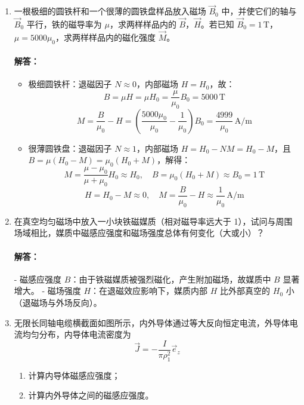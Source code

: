 \begin{enumerate}
    \item 一根极细的圆铁杆和一个很薄的圆铁盘样品放入磁场 $\vec{B}_0$ 中，并使它们的轴与 $\vec{B}_0$ 平行，铁的磁导率为 $\mu$，求两样样品内的 $\vec{B}$，$\vec{H}$。若已知 $\vec{B}_0=1\,\text{T}$，$\mu=5000\mu_0$，求两样样品内的磁化强度 $\vec{M}$。

    \paragraph{解答：}
    \begin{itemize}
        \item 极细圆铁杆：退磁因子 $N\approx0$，内部磁场 $H=H_0$，故：
        \[
        B = \mu H = \mu H_0 = \frac{\mu}{\mu_0}B_0 = 5000\,\text{T}
        \]
        \[
        M = \frac{B}{\mu_0} - H = \left(\frac{5000\mu_0}{\mu_0} - \frac{1}{\mu_0}\right)B_0 = \frac{4999}{\mu_0}\,\text{A/m}
        \]

        \item 很薄圆铁盘：退磁因子 $N\approx1$，内部磁场 $H=H_0 - N M = H_0 - M$，且 $B=\mu(H_0 - M)=\mu_0(H_0 + M)$，解得：
        \[
        M = \frac{\mu-\mu_0}{\mu+\mu_0}H_0 \approx H_0, \quad B=\mu_0(H_0+M) \approx B_0=1\,\text{T}
        \]
        \[
        H = H_0 - M \approx 0, \quad M = \frac{B}{\mu_0} - H \approx \frac{1}{\mu_0}\,\text{A/m}
        \]
    \end{itemize}

    \item 在真空均匀磁场中放入一小块铁磁媒质（相对磁导率远大于 1），试问与周围场域相比，媒质中磁感应强度和磁场强度总体有何变化（大或小）？

    \paragraph{解答：}
    - 磁感应强度 $B$：由于铁磁媒质被强烈磁化，产生附加磁场，故媒质中 $B$ 显著增大。
    - 磁场强度 $H$：在退磁效应影响下，媒质内部 $H$ 比外部真空的 $H_0$ 小（退磁场与外场反向）。

    \item 无限长同轴电缆横截面如图所示，内外导体通过等大反向恒定电流，外导体电流均匀分布，内导体电流密度为
    \[
    \vec{J} = -\frac{I}{\pi\rho_1^2}\vec{e}_z
    \]

    \begin{enumerate}
        \item 计算内导体磁感应强度；
        \item 计算内外导体之间的磁感应强度。
    \end{enumerate}


\end{enumerate}
